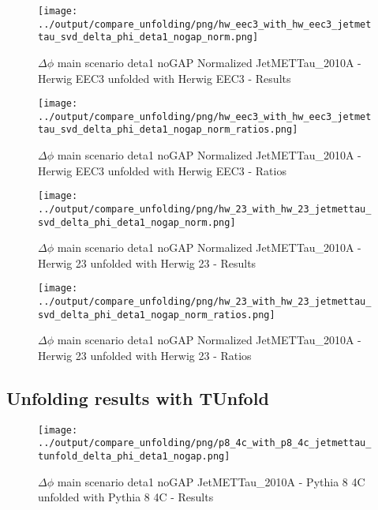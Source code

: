 \documentclass[11pt]{book}
\begin{document}
\begin{figure}[ht]
\centering
\texttt{[image: ../output/compare\_unfolding/png/hw\_eec3\_with\_hw\_eec3\_jetmettau\_svd\_delta\_phi\_deta1\_nogap\_norm.png]}
\caption{$\Delta\phi$ main scenario deta1 noGAP Normalized JetMETTau\_2010A - Herwig EEC3 unfolded with Herwig EEC3 - Results}
\label{hw_eec3_hw_eec3_jetmettau_svd_delta_phi_deta1_nogap_norm_a}
\end{figure}

\begin{figure}[ht]
\centering
\texttt{[image: ../output/compare\_unfolding/png/hw\_eec3\_with\_hw\_eec3\_jetmettau\_svd\_delta\_phi\_deta1\_nogap\_norm\_ratios.png]}
\caption{$\Delta\phi$ main scenario deta1 noGAP Normalized JetMETTau\_2010A - Herwig EEC3 unfolded with Herwig EEC3 - Ratios}
\label{hw_eec3_hw_eec3_jetmettau_svd_delta_phi_deta1_nogap_norm_b}
\end{figure}

\begin{figure}[ht]
\centering
\texttt{[image: ../output/compare\_unfolding/png/hw\_23\_with\_hw\_23\_jetmettau\_svd\_delta\_phi\_deta1\_nogap\_norm.png]}
\caption{$\Delta\phi$ main scenario deta1 noGAP Normalized JetMETTau\_2010A - Herwig 23 unfolded with Herwig 23 - Results}
\label{hw_23_hw_23_jetmettau_svd_delta_phi_deta1_nogap_norm_a}
\end{figure}

\begin{figure}[ht]
\centering
\texttt{[image: ../output/compare\_unfolding/png/hw\_23\_with\_hw\_23\_jetmettau\_svd\_delta\_phi\_deta1\_nogap\_norm\_ratios.png]}
\caption{$\Delta\phi$ main scenario deta1 noGAP Normalized JetMETTau\_2010A - Herwig 23 unfolded with Herwig 23 - Ratios}
\label{hw_23_hw_23_jetmettau_svd_delta_phi_deta1_nogap_norm_b}
\end{figure}


\clearpage
\subsection{Unfolding results with TUnfold}

\begin{figure}[ht]
\centering
\texttt{[image: ../output/compare\_unfolding/png/p8\_4c\_with\_p8\_4c\_jetmettau\_tunfold\_delta\_phi\_deta1\_nogap.png]}
\caption{$\Delta\phi$ main scenario deta1 noGAP JetMETTau\_2010A - Pythia 8 4C unfolded with Pythia 8 4C - Results}
\label{p8_p8_jetmettau_tunfold_delta_phi_deta1_nogap_a}
\end{figure}
\end{document}
